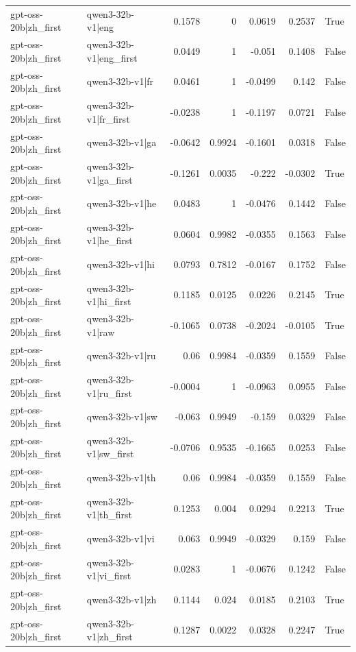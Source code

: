 \begin{table}
\begin{tabular}{l l r r r r l}
gpt-oss-20b|zh_first & qwen3-32b-v1|eng & 0.1578 & 0 & 0.0619 & 0.2537 & True \\
gpt-oss-20b|zh_first & qwen3-32b-v1|eng_first & 0.0449 & 1 & -0.051 & 0.1408 & False \\
gpt-oss-20b|zh_first & qwen3-32b-v1|fr & 0.0461 & 1 & -0.0499 & 0.142 & False \\
gpt-oss-20b|zh_first & qwen3-32b-v1|fr_first & -0.0238 & 1 & -0.1197 & 0.0721 & False \\
gpt-oss-20b|zh_first & qwen3-32b-v1|ga & -0.0642 & 0.9924 & -0.1601 & 0.0318 & False \\
gpt-oss-20b|zh_first & qwen3-32b-v1|ga_first & -0.1261 & 0.0035 & -0.222 & -0.0302 & True \\
gpt-oss-20b|zh_first & qwen3-32b-v1|he & 0.0483 & 1 & -0.0476 & 0.1442 & False \\
gpt-oss-20b|zh_first & qwen3-32b-v1|he_first & 0.0604 & 0.9982 & -0.0355 & 0.1563 & False \\
gpt-oss-20b|zh_first & qwen3-32b-v1|hi & 0.0793 & 0.7812 & -0.0167 & 0.1752 & False \\
gpt-oss-20b|zh_first & qwen3-32b-v1|hi_first & 0.1185 & 0.0125 & 0.0226 & 0.2145 & True \\
gpt-oss-20b|zh_first & qwen3-32b-v1|raw & -0.1065 & 0.0738 & -0.2024 & -0.0105 & True \\
gpt-oss-20b|zh_first & qwen3-32b-v1|ru & 0.06 & 0.9984 & -0.0359 & 0.1559 & False \\
gpt-oss-20b|zh_first & qwen3-32b-v1|ru_first & -0.0004 & 1 & -0.0963 & 0.0955 & False \\
gpt-oss-20b|zh_first & qwen3-32b-v1|sw & -0.063 & 0.9949 & -0.159 & 0.0329 & False \\
gpt-oss-20b|zh_first & qwen3-32b-v1|sw_first & -0.0706 & 0.9535 & -0.1665 & 0.0253 & False \\
gpt-oss-20b|zh_first & qwen3-32b-v1|th & 0.06 & 0.9984 & -0.0359 & 0.1559 & False \\
gpt-oss-20b|zh_first & qwen3-32b-v1|th_first & 0.1253 & 0.004 & 0.0294 & 0.2213 & True \\
gpt-oss-20b|zh_first & qwen3-32b-v1|vi & 0.063 & 0.9949 & -0.0329 & 0.159 & False \\
gpt-oss-20b|zh_first & qwen3-32b-v1|vi_first & 0.0283 & 1 & -0.0676 & 0.1242 & False \\
gpt-oss-20b|zh_first & qwen3-32b-v1|zh & 0.1144 & 0.024 & 0.0185 & 0.2103 & True \\
gpt-oss-20b|zh_first & qwen3-32b-v1|zh_first & 0.1287 & 0.0022 & 0.0328 & 0.2247 & True \\

\end{tabular}
\end{table}
